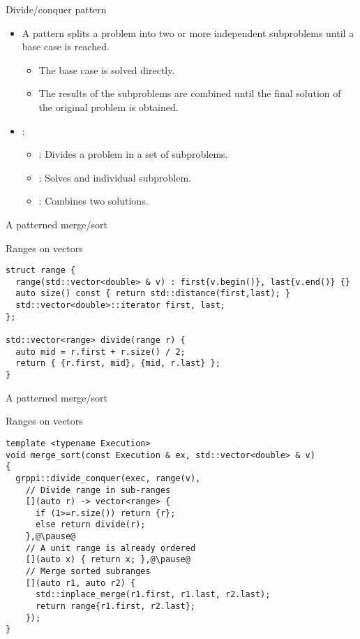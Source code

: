 \begin{frame}[t]{Divide/conquer pattern}
\begin{itemize}
  \item A  pattern splits a problem into two or more independent subproblems until a base case is reached.
    \begin{itemize}
      \item The base case is solved directly.
      \item The results of the subproblems are combined until the final solution of the original problem is obtained.
    \end{itemize}

  \vfill\pause
  \item {}:
    \begin{itemize}
      \item {}: Divides a problem in a set of subproblems.
      \item {}: Solves and individual subproblem.
      \item {}: Combines two solutions.
    \end{itemize}
\end{itemize}
\end{frame}

\begin{frame}[t,fragile]{A patterned merge/sort}
\begin{block}{Ranges on vectors}
\begin{lstlisting}
struct range {
  range(std::vector<double> & v) : first{v.begin()}, last{v.end()} {}
  auto size() const { return std::distance(first,last); }
  std::vector<double>::iterator first, last;
};

std::vector<range> divide(range r) {
  auto mid = r.first + r.size() / 2;
  return { {r.first, mid}, {mid, r.last} };
}
\end{lstlisting}
\end{block}
\end{frame}

\begin{frame}[t,fragile]{A patterned merge/sort}
\begin{block}{Ranges on vectors}
\begin{lstlisting}[escapechar=@]
template <typename Execution>
void merge_sort(const Execution & ex, std::vector<double> & v)
{
  grppi::divide_conquer(exec, range(v),
    // Divide range in sub-ranges
    [](auto r) -> vector<range> {
      if (1>=r.size()) return {r};
      else return divide(r);
    },@\pause@
    // A unit range is already ordered
    [](auto x) { return x; },@\pause@
    // Merge sorted subranges
    [](auto r1, auto r2) {
      std::inplace_merge(r1.first, r1.last, r2.last);
      return range{r1.first, r2.last};
    });
}
\end{lstlisting}
\end{block}
\end{frame}
